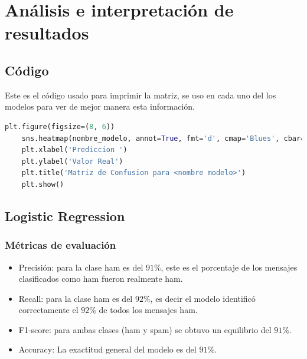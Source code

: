 \section{Análisis e interpretación de resultados}


\subsection{Código}

Este es el código usado para imprimir la matriz, se uso en cada uno del los modelos para 
ver de mejor manera esta información.

\begin{lstlisting}[style=mystylepython, language=Python, caption= código de grafico de matriz]
    plt.figure(figsize=(8, 6))
    sns.heatmap(nombre_modelo, annot=True, fmt='d', cmap='Blues', cbar=False)
    plt.xlabel('Prediccion ')
    plt.ylabel('Valor Real')
    plt.title('Matriz de Confusion para <nombre modelo>')
    plt.show()    
\end{lstlisting}

\subsection{Logistic Regression}

\subsubsection*{Métricas de evaluación}

\begin{itemize}
    \item Precisión: para la clase ham es del $91\%$, este es el porcentaje de los mensajes clasificados como ham fueron realmente ham.
    \item Recall: para la clase ham es del $92\%$, es decir el modelo identificó correctamente el $92\%$ de todos los mensajes ham.
    \item F1-score: para ambas clases (ham y spam) se obtuvo un equilibrio del $91\%$.     
    \item Accuracy: La exactitud general del modelo es del $91\%$.
\end{itemize}


